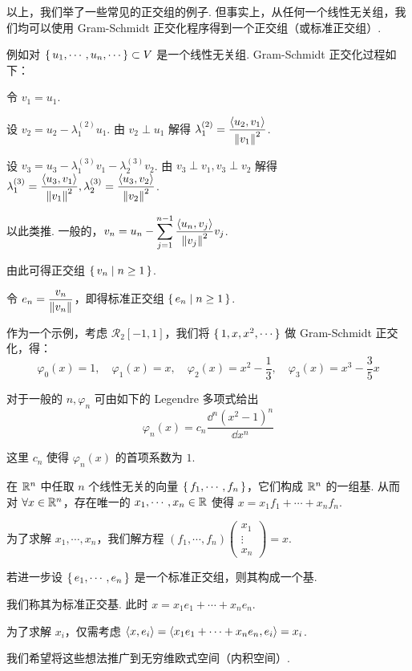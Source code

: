 以上，我们举了一些常见的正交组的例子. 但事实上，从任何一个线性无关组，我们均可以使用 Gram-Schmidt 正交化程序得到一个正交组（或标准正交组）.

例如对 $\set{u_1,\cdots,u_n,\cdots}\subset V$ 是一个线性无关组. Gram-Schmidt 正交化过程如下：

令 $v_1=u_1$.

设 $v_2=u_2-\lambda_1^{(2)}u_1$. 由 $v_2\perp u_1$ 解得 $\lambda_1^{(2)}=\dfrac{\left\langle{u_2,v_1}\right\rangle}{\left\lVert{v_1}\right\rVert^2}$.

设 $v_3=u_3-\lambda_1^{(3)}v_1-\lambda_2^{(3)}v_2$. 由 $v_3\perp v_1,v_3\perp v_2$ 解得 $\lambda_1^{(3)}=\dfrac{\left\langle{u_3,v_1}\right\rangle}{\left\lVert{v_1}\right\rVert^2},\lambda_2^{(3)}=\dfrac{\left\langle{u_3,v_2}\right\rangle}{\left\lVert{v_2}\right\rVert^2}$.

以此类推. 一般的，$v_n=u_n-\displaystyle\sum_{j=1}^{n-1}\frac{\left\langle{u_n,v_j}\right\rangle}{\left\lVert{v_j}\right\rVert^2}v_j$.

由此可得正交组 $\set{v_n|n\ge 1}$.

令 $e_n=\dfrac{v_n}{\left\lVert{v_n}\right\rVert}$，即得标准正交组 $\set{e_n|n\ge 1}$.

作为一个示例，考虑 $\mathcal{R}_2[-1,1]$，我们将 $\set{1,x,x^2,\cdots}$ 做 Gram-Schmidt 正交化，得：
$$
\varphi_0(x)=1,\quad\varphi_1(x)=x,\quad\varphi_2(x)=x^2-\frac{1}{3},\quad\varphi_3(x)=x^3-\frac{3}{5}x
$$

对于一般的 $n,\varphi_n$ 可由如下的 Legendre 多项式给出
$$
\varphi_n(x)=c_n\frac{\dd^n(x^2-1)^n}{\dd x^n}
$$

这里 $c_n$ 使得 $\varphi_n(x)$ 的首项系数为 $1$.


在 $\mathbb{R}^n$ 中任取 $n$ 个线性无关的向量 $\set{f_1,\cdots,f_n}$，它们构成 $\mathbb{R}^n$ 的一组基. 从而对 $\forall x\in\mathbb{R}^n$，存在唯一的 $x_1,\cdots,x_n\in\mathbb{R}$ 使得 $x=x_1f_1+\cdots+x_nf_n$.

为了求解 $x_1,\cdots,x_n$，我们解方程 $(f_1,\cdots,f_n)\begin{pmatrix}x_1\\\vdots\\x_n\end{pmatrix}=x$.

若进一步设 $\set{e_1,\cdots,e_n}$ 是一个标准正交组，则其构成一个基.

我们称其为标准正交基. 此时 $x=x_1e_1+\cdots+x_ne_n$.

为了求解 $x_i$，仅需考虑 $\left\langle{x,e_i}\right\rangle=\left\langle{x_1e_1+\cdots+x_ne_n,e_i}\right\rangle=x_i$.

我们希望将这些想法推广到无穷维欧式空间（内积空间）.

